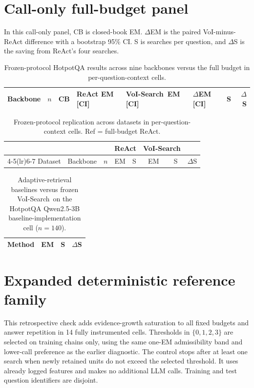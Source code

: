 \documentclass[manuscript,nonacm]{acmart}
\newcommand{\system}{VoI-Search}
\begin{document}
\section{Call-only full-budget panel}
\label{supp:call-only}

In this call-only panel, CB is closed-book EM. $\Delta$EM is the paired
VoI-minus-ReAct difference with a bootstrap 95\% CI. S is searches per
question, and $\Delta$S is the saving from ReAct's four searches.

\begin{table}[H]
\caption{Frozen-protocol HotpotQA results across nine backbones versus the
full budget in per-question-context cells.}
\label{tab:supp-backbones}
\small
\setlength{\tabcolsep}{4pt}
\begin{tabular}{l r r l l l r r}
\toprule
Backbone & $n$ & CB & ReAct EM\,[CI] & \system\ EM\,[CI] & $\Delta$EM\,[CI] & S & $\Delta$S \\
\midrule

\bottomrule
\end{tabular}
\end{table}

\begin{table}[H]
\caption{Frozen-protocol replication across datasets in
per-question-context cells. Ref = full-budget ReAct.}
\label{tab:supp-datasets}
\small
\begin{tabular}{l l r cc cc c}
\toprule
& & & \multicolumn{2}{c}{ReAct} & \multicolumn{2}{c}{\system} & \\
\cmidrule(lr){4-5}\cmidrule(lr){6-7}
Dataset & Backbone & $n$ & EM & S & EM & S & $\Delta$S \\
\midrule

\bottomrule
\end{tabular}
\end{table}

\begin{table}[H]
\caption{Adaptive-retrieval baselines versus frozen \system\ on the HotpotQA
Qwen2.5-3B baseline-implementation cell ($n{=}140$).}
\label{tab:supp-baselines}
\small
\begin{tabular}{l r r r}
\toprule
Method & EM & S & $\Delta$S \\
\midrule

\bottomrule
\end{tabular}
\end{table}

\FloatBarrier
\section{Expanded deterministic reference family}
\label{supp:deterministic-controls}
This retrospective check adds evidence-growth saturation to all fixed budgets
and answer repetition in 14 fully instrumented cells. Thresholds in
$\{0,1,2,3\}$ are selected on training chains only, using the same one-EM
admissibility band and lower-call preference as the earlier diagnostic.
The control stops after at least one search when newly retained units do not
exceed the selected threshold. It uses already logged features and makes no
additional LLM calls. Training and test question identifiers are disjoint.
\end{document}
